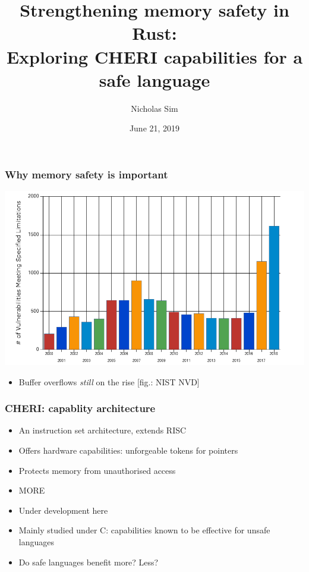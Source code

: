 \documentclass{beamer}
\begin{document}
\title{Strengthening memory safety in Rust:\\
Exploring CHERI capabilities for a safe language}
\author{Nicholas Sim}
\date{June 21, 2019}

\frame{\titlepage}


\begin{frame}
\frametitle{Why memory safety is important}

\includegraphics[width=\textwidth]{graph-overflow.png}
\begin{itemize}
    \item Buffer overflows \emph{still} on the rise [fig.: NIST NVD]
\end{itemize}
\end{frame}


\begin{frame}
\frametitle{CHERI: capablity architecture}

\begin{itemize}
    \item An instruction set architecture, extends RISC
    \item Offers hardware capabilities: unforgeable tokens for pointers
    \item Protects memory from unauthorised access
    \item MORE
    \item Under development here
    \item Mainly studied under C: capabilities known to be effective for
    unsafe languages
    \item Do safe languages benefit more? Less?
\end{itemize}
\end{frame}
\end{document}
